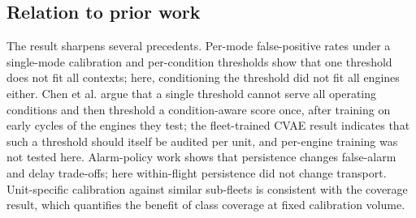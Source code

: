 \documentclass[preprint,11pt,a4paper]{elsarticle}
\begin{document}
\subsection{Relation to prior work}

The result sharpens several precedents. Per-mode false-positive rates under a single-mode calibration \cite{N23} and per-condition thresholds \cite{N22,N26} show that one threshold does not fit all contexts; here, conditioning the threshold did not fit all engines either. Chen et al. \cite{N38} argue that a single threshold cannot serve all operating conditions and then threshold a condition-aware score once, after training on early cycles of the engines they test; the fleet-trained CVAE result indicates that such a threshold should itself be audited per unit, and per-engine training was not tested here. Alarm-policy work \cite{N39,N40} shows that persistence changes false-alarm and delay trade-offs; here within-flight persistence did not change transport. Unit-specific calibration against similar sub-fleets \cite{N44} is consistent with the coverage result, which quantifies the benefit of class coverage at fixed calibration volume.
\end{document}

